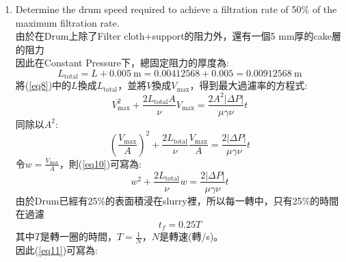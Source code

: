 \documentclass[12pt,a4paper]{article}
\begin{document}
\begin{problems}
\begin{enumerate}
    整理可得:
    \begin{equation}
      d_p^2 = \frac{180\left(1-\varepsilon\right)^2}{\varepsilon^3 \gamma} \implies d_p = \sqrt{\frac{180\left(1-\varepsilon\right)^2}{\varepsilon^3 \gamma}}
    \end{equation}
    將$\gamma=2.2037\times10^{12}~\text{m}^{-2}$, $\varepsilon=0.333$代入:
    \begin{equation}
      d_p =\sqrt{
        \frac{180\left(1-0.333\right)^2}{0.333^3 \cdot 2.2037\times10^{12}}
      } = 3.137 \times 10^{-5}~\text{m}
    \end{equation}
    \# Answer: \underline{$d_p=3.137\times10^{-5}~\text{m}\approx 31.3~\mu \text{m}$}
    \item Determine the drum speed required to achieve a filtration rate of 50\% of the maximum filtration rate.\\
    由於在Drum上除了Filter cloth+support的阻力外，還有一個5 mm厚的cake層的阻力\\
    因此在Constant Pressure下，總固定阻力的厚度為:
    \begin{equation}
      L_{\text{total}} = L + 0.005~\text{m} = 0.00412568 + 0.005 = 0.00912568~\text{m}
    \end{equation}
    將(\ref{eq8})中的$L$換成$L_{\text{total}}$，並將$V$換成$V_{\text{max}}$，得到最大過濾率的方程式:
    \begin{equation}
      V_{\text{max}}^2 + \frac{2L_{\text{total}}A}{\nu}V_{\text{max}} = \frac{2A^2\left|\Delta P\right|}{\mu\gamma\nu}t \label{eq9}
    \end{equation}
    同除以$A^2$:
    \begin{equation}
      \left(\frac{V_{\text{max}}}{A}\right)^2 + \frac{2L_{\text{total}}}{\nu}\frac{V_{\text{max}}}{A} = \frac{2\left|\Delta P\right|}{\mu\gamma\nu}t \label{eq10}
    \end{equation}
    令$w=\frac{V_{\text{max}}}{A}$，則(\ref{eq10})可寫為:
    \begin{equation}
      w^2 + \frac{2L_{\text{total}}}{\nu}w = \frac{2\left|\Delta P\right|}{\mu\gamma\nu}t \label{eq11}
    \end{equation}
    由於Drum已經有25\%的表面積浸在slurry裡，所以每一轉中，只有25\%的時間在過濾
    \begin{equation}
      t_f = 0.25 T
    \end{equation}
    其中$T$是轉一圈的時間，$T=\frac{1}{N}$，$N$是轉速(轉/s)。\\
    因此(\ref{eq11})可寫為:
    \begin{equation}

\end{equation}
\end{enumerate}
\end{problems}
\end{document}
